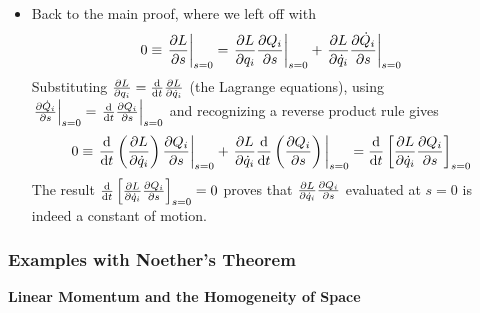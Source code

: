 \documentclass[11pt, a4paper]{article}
\begin{document}
\begin{itemize}
	\item Back to the main proof, where we left off with 
	\begin{equation*}
		0 \equiv \eval{\pdv{L}{s}}_{s=0} = \eval{\pdv{L}{q_{i}} \pdv{Q_{i}}{s}}_{s=0} + \eval{\pdv{L}{\dot{q}_{i}} \pdv{\dot{Q}_{i}}{s}}_{s=0}
	\end{equation*}		
	Substituting $ \pdv{L}{q_{i}} = \dv{}{t}\pdv{L}{\dot{q}_{i}}$ (the Lagrange equations), using $ \eval{\pdv{\dot{Q}_{i}}{s}}_{s=0} = \eval{\dv{}{t}\pdv{Q_{i}}{s}}_{s=0} $ and recognizing a reverse product rule gives
	\begin{equation*}
		0 \equiv \eval{\dv{}{t}\left(\pdv{L}{\dot{q}_{i}}\right) \pdv{Q_{i}}{s}}_{s=0} + \eval{\pdv{L}{\dot{q}_{i}}  \dv{}{t}\left(\pdv{Q_{i}}{s}\right)}_{s=0} =\dv{}{t} \left[\pdv{L}{\dot{q}_{i}}\pdv{Q_{i}}{s} \right]_{s=0}
	\end{equation*}
	The result $ \dv{}{t} \left[\pdv{L}{\dot{q}_{i}}\pdv{Q_{i}}{s} \right]_{s=0} = 0 $ proves that $ \pdv{L}{\dot{q}_{i}}\pdv{Q_{i}}{s} $ evaluated at $ s=0 $ is indeed a constant of motion.
\end{itemize}

\subsubsection{Examples with Noether's Theorem}

\textbf{Linear Momentum and the Homogeneity of Space}
\end{document}
